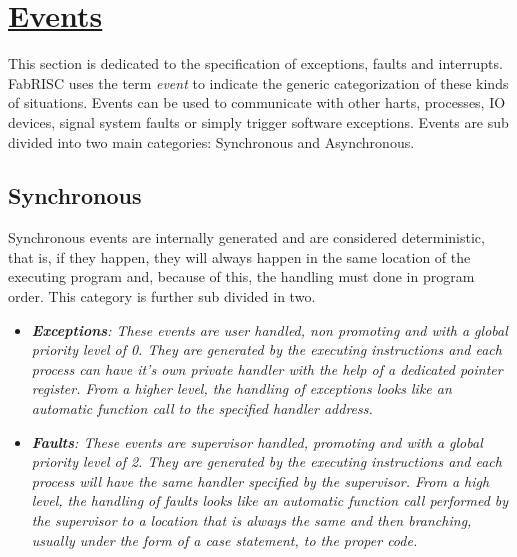 \documentclass{article}
\begin{document}
    \section[Events]{\LARGE\underline{Events}} %

        \vspace{10pt}

        This section is dedicated to the specification of exceptions, faults and interrupts. FabRISC uses the term \textit{event} to indicate the generic categorization of these kinds of situations. Events can be used to communicate with other harts, processes, IO devices, signal system faults or simply trigger software exceptions. Events are sub divided into two main categories: Synchronous and Asynchronous.

        \subsection{Synchronous}

            \vspace{10pt}

            Synchronous events are internally generated and are considered deterministic, that is, if they happen, they will always happen in the same location of the executing program and, because of this, the handling must done in program order. This category is further sub divided in two.

            \begin{itemize}

                \item \textit{\textbf{Exceptions}: These events are user handled, non promoting and with a global priority level of 0. They are generated by the executing instructions and each process can have it's own private handler with the help of a dedicated pointer register. From a higher level, the handling of exceptions looks like an automatic function call to the specified handler address.}

                \item \textit{\textbf{Faults}: These events are supervisor handled, promoting and with a global priority level of 2. They are generated by the executing instructions and each process will have the same handler specified by the supervisor. From a high level, the handling of faults looks like an automatic function call performed by the supervisor to a location that is always the same and then branching, usually under the form of a case statement, to the proper code.}

            \end{itemize}
\end{document}

